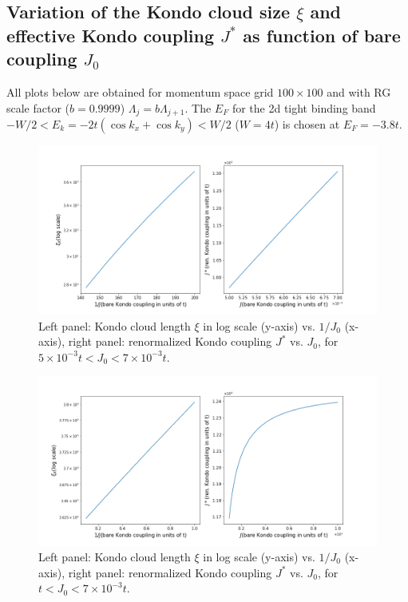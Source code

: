 \documentclass[aps,prx,preprint,groupedaddress]{revtex4-2}
\begin{document}
\subsection{Variation of the Kondo cloud size $\xi$ and effective Kondo coupling $J^{*}$ as function of bare coupling $J_{0}$}
All plots below are obtained for momentum space grid $100\times 100$ and with RG scale factor ($b=0.9999$) $\Lambda_{j}=b\Lambda_{j+1}$. The $E_{F}$ for the 2d tight binding band $-W/2<E_{k}=-2t(\cos k_{x}+\cos k_{y})<W/2$ ($W=4t$) is chosen at $E_{F}=-3.8t$. 
\begin{figure}
\includegraphics[width=\textwidth]{KondoRegime1.png}
\caption{Left panel: Kondo cloud length $\xi$ in log scale (y-axis) vs. $1/J_{0}$ (x-axis), right panel: renormalized Kondo coupling $J^{*}$ vs. $J_{0}$, for $5\times 10^{-3}t<J_{0}<7\times 10^{-3}t$.}
\end{figure}
\begin{figure}
\includegraphics[width=\textwidth]{KondoRegime3.png}
\caption{Left panel: Kondo cloud length $\xi$ in log scale (y-axis) vs. $1/J_{0}$ (x-axis), right panel: renormalized Kondo coupling $J^{*}$ vs. $J_{0}$, for $t<J_{0}<7\times 10^{-3}t$.}
\end{figure}
\end{document}
